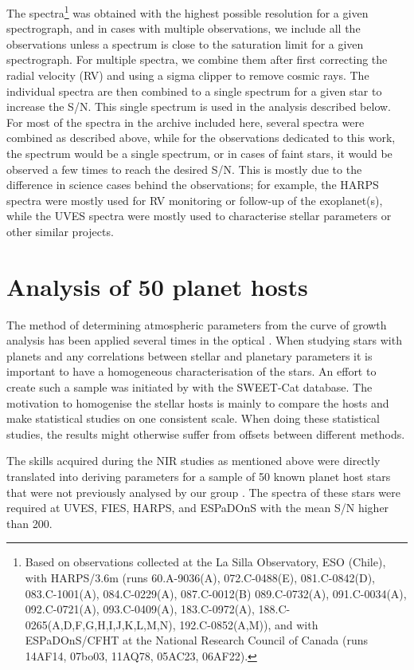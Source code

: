 The spectra\footnote{Based on observations collected at the La Silla Observatory, ESO (Chile), with
HARPS/3.6m (runs 60.A-9036(A), 072.C-0488(E), 081.C-0842(D), 083.C-1001(A), 084.C-0229(A),
087.C-0012(B) 089.C-0732(A), 091.C-0034(A), 092.C-0721(A), 093.C-0409(A), 183.C-0972(A),
188.C-0265(A,D,F,G,H,I,J,K,L,M,N), 192.C-0852(A,M)), and with ESPaDOnS/CFHT at the National Research
Council of Canada (runs 14AF14, 07bo03, 11AQ78, 05AC23, 06AF22).} was obtained with the highest
possible resolution for a given spectrograph, and in cases with multiple observations, we include
all the observations unless a spectrum is close to the saturation limit for a given spectrograph.
For multiple spectra, we combine them after first correcting the radial velocity (RV) and using a
sigma clipper to remove cosmic rays. The individual spectra are then combined to a single spectrum
for a given star to increase the S/N. This single spectrum is used in the analysis described below.
For most of the spectra in the archive included here, several spectra were combined as described
above, while for the observations dedicated to this work, the spectrum would be a single spectrum,
or in cases of faint stars, it would be observed a few times to reach the desired S/N. This is
mostly due to the difference in science cases behind the observations; for example, the HARPS
spectra were mostly used for RV monitoring or follow-up of the exoplanet(s), while the UVES spectra
were mostly used to characterise stellar parameters or other similar projects.

\section{Analysis of 50 planet hosts}
\label{sec:sweetcat_analysis}

The method of determining atmospheric parameters from the curve of growth analysis has been applied
several times in the optical \citep[see e.g.][]{Sousa2011,Mortier2013b,Tsantaki2013,Santos2013}.
When studying stars with planets and any correlations between stellar and planetary parameters it is
important to have a homogeneous characterisation of the stars. An effort to create such a sample was
initiated by \citet{Santos2013} with the SWEET-Cat database. The motivation to homogenise the
stellar hosts is mainly to compare the hosts and make statistical studies on one consistent scale.
When doing these statistical studies, the results might otherwise suffer from offsets between
different methods.

The skills acquired during the NIR studies as mentioned above were directly translated into deriving
parameters for a sample of 50 known planet host stars that were not previously analysed by our group
\citep{Andreasen2017a}. The spectra of these stars were required at UVES, FIES, HARPS, and ESPaDOnS
with the mean S/N higher than 200.

